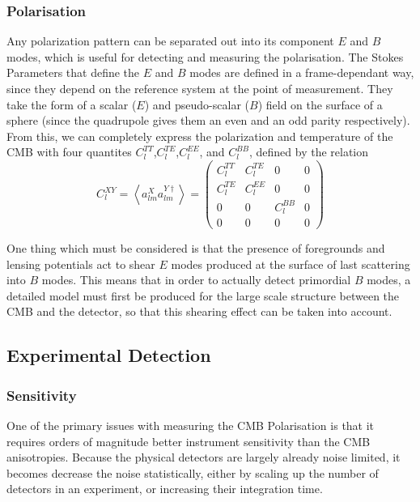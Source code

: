 \subsubsection{Polarisation}
Any polarization pattern can be separated out into its component $E$ and $B$ modes, which is useful for detecting and measuring the polarisation. The Stokes Parameters that define the $E$ and $B$ modes are defined in a frame-dependant way, since they depend on the reference system at the point of measurement. They take the form of a scalar ($E$) and pseudo-scalar ($B$) field on the surface of a sphere (since the quadrupole gives them an even and an odd parity respectively). From this, we can completely express the polarization and temperature of the CMB with four quantites $C_l^{TT}$,$C_l^{TE}$,$C_l^{EE}$, and $C_l^{BB}$, defined by the relation
\begin{equation} \label{eq:cmb_plr_tmp}
C_l^{XY} = \left< a_{lm}^X a_{lm}^{Y\dagger} \right> = \begin{pmatrix}
C_l^{TT} & C_l^{TE} & 0 & 0 \\
C_l^{TE} & C_l^{EE} & 0 & 0 \\
0 & 0 & C_l^{BB} & 0 \\
0 & 0 & 0 & 0
\end{pmatrix}
\end{equation}

\par One thing which must be considered is that the presence of foregrounds and lensing potentials act to shear $E$ modes produced at the surface of last scattering into $B$ modes. This means that in order to actually detect primordial $B$ modes, a detailed model must first be produced for the large scale structure between the CMB and the detector, so that this shearing effect can be taken into account. 

\subsection{Experimental Detection}

\subsubsection{Sensitivity}
One of the primary issues with measuring the CMB Polarisation is that it requires orders of magnitude better instrument sensitivity than the CMB anisotropies. Because the physical detectors are largely already noise limited, it becomes decrease the noise statistically, either by scaling up the number of detectors in an experiment, or increasing their integration time. 

